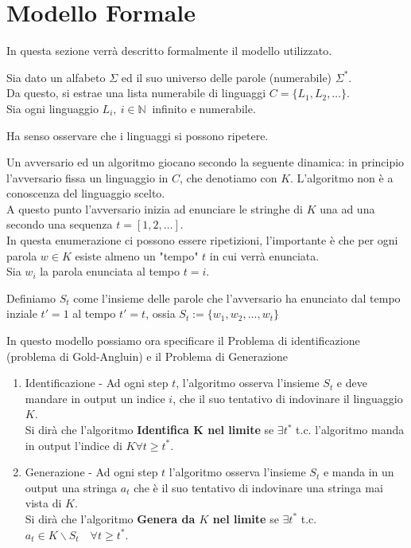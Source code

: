 \documentclass{report}
\newenvironment{pop}{}{}
\begin{document}
\section{Modello Formale}
\begin{pop}
  In questa sezione verrà descritto formalmente il modello utilizzato.

  Sia dato un alfabeto $\Sigma$ ed il suo universo delle parole (numerabile) $\Sigma^*$. \\
  Da questo, si estrae una lista numerabile di linguaggi $C = \{L_1,L_2,\dots\}$.\\ 
  Sia ogni linguaggio $L_i,\ i \in \mathds{N} \ $ infinito e numerabile.

  Ha senso osservare che i linguaggi si possono ripetere.
  
  Un avversario ed un algoritmo giocano secondo la seguente dinamica: in principio l'avversario fissa 
un linguaggio in $C$, che denotiamo con $K$. L'algoritmo non è a conoscenza del linguaggio scelto.\\ 
A questo punto l'avversario inizia ad enunciare le stringhe di $K$ una ad una secondo una sequenza $t=[1,2,\dots]$.\\
  In questa enumerazione ci possono essere ripetizioni, l'importante è che per ogni parola $w \in K$ esiste almeno un "tempo" $t$ in cui verrà enunciata.\\ 
  Sia $w_i$ la parola enunciata al tempo $t=i$.

  Definiamo $S_t$ come l'insieme delle parole che l'avversario ha enunciato dal tempo inziale $t'=1$ al tempo $t'=t$, ossia $S_t := \{w_1, w_2, \dots , w_t\}$

  In questo modello possiamo ora specificare il Problema di identificazione (problema di Gold-Angluin) e il Problema di Generazione

  \begin{enumerate}
    \item Identificazione - Ad ogni step $t$, l'algoritmo osserva l'insieme $S_t$ e deve mandare in output un indice $i$, 
      che il suo tentativo di indovinare il linguaggio $K$. \\ 
      Si dirà che l'algoritmo \textbf{Identifica K nel limite} se $\exists t^*$ t.c. 
      l'algoritmo manda in output l'indice di $K \forall t \geq t^*$. 
    \item Generazione - Ad ogni step $t$ l'algoritmo osserva l'insieme $S_t$ e manda in un output una stringa $a_t$ 
      che è il suo tentativo di indovinare una stringa mai vista di $K$.\\ 
      Si dirà che l'algoritmo \textbf{Genera da $K$ nel limite} se $\exists t^*$ t.c. $a_t \in K \backslash S_t \quad \forall t \geq t^*$.
  \end{enumerate}
  

\end{pop}
\end{document}
